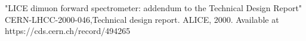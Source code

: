 
"LICE dimuon forward spectrometer: addendum to the
Technical Design Report" CERN-LHCC-2000-046,Technical design report. ALICE, 2000. Available at https://cds.cern.ch/record/494265